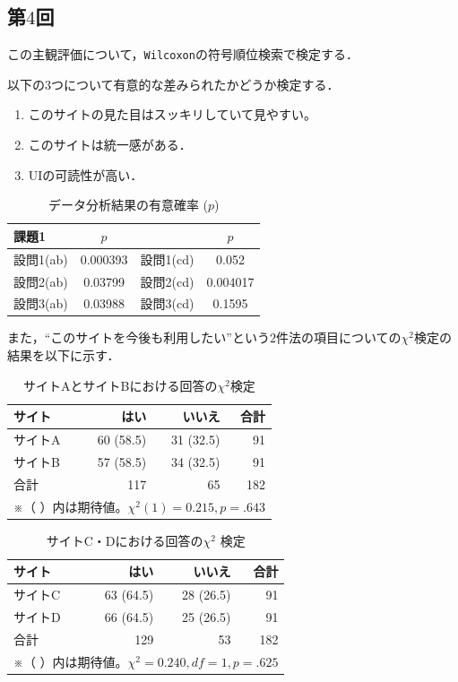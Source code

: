 \documentclass{jlreq}
\begin{document}
  \subsection*{第$4$回}
  この主観評価について，\verb|Wilcoxon|の符号順位検索で検定する．

  以下の$3$つについて有意的な差みられたかどうか検定する．
  \begin{enumerate}[1. ]
    \item このサイトの見た目はスッキリしていて見やすい。
    \item このサイトは統一感がある．
    \item UIの可読性が高い．
  \end{enumerate}
  \begin{table}[htbp]
    \centering
    \caption{データ分析結果の有意確率 ($p$)}
    \begin{tabular}{|l|c|l|c|}
      \hline
      課題1 & $p$ & & $p$ \\ \hline
      設問1(ab) & 0.000393 & 設問1(cd) & 0.052 \\ \hline
      設問2(ab) & 0.03799 & 設問2(cd) & 0.004017 \\ \hline
      設問3(ab) & 0.03988 & 設問3(cd) & 0.1595 \\ \hline
    \end{tabular}
  \end{table}

  また，``このサイトを今後も利用したい''という$2$件法の項目についての$\chi ^ 2$検定の結果を以下に示す．

  \begin{table}[H]
    \centering
    \caption{サイトAとサイトBにおける回答の$\chi ^2 $検定}
    \begin{tabular}{lrrr}
      \toprule
      サイト & はい & いいえ & 合計 \\
      \midrule
      サイトA & 60 (58.5) & 31 (32.5) & 91 \\
      サイトB & 57 (58.5) & 34 (32.5) & 91 \\
      \midrule
      合計 & 117 & 65 & 182 \\
      \bottomrule
      \multicolumn{4}{l}{\small ※（ ）内は期待値。$\chi^2(1) = 0.215, p = .643$}
    \end{tabular}
  \end{table}

  \begin{table}[H]
    \centering
    \caption{サイトC・Dにおける回答の$\chi ^ 2$ 検定}
    \begin{tabular}{lrrr}
      \toprule
      サイト & はい & いいえ & 合計 \\
      \midrule
      サイトC & 63 (64.5) & 28 (26.5) & 91 \\
      サイトD & 66 (64.5) & 25 (26.5) & 91 \\
      \midrule
      合計 & 129 & 53 & 182 \\
      \bottomrule
      \multicolumn{4}{l}{\small ※（ ）内は期待値。$\chi^2 = 0.240, df = 1, p = .625$}
    \end{tabular}
  \end{table}
\end{document}
